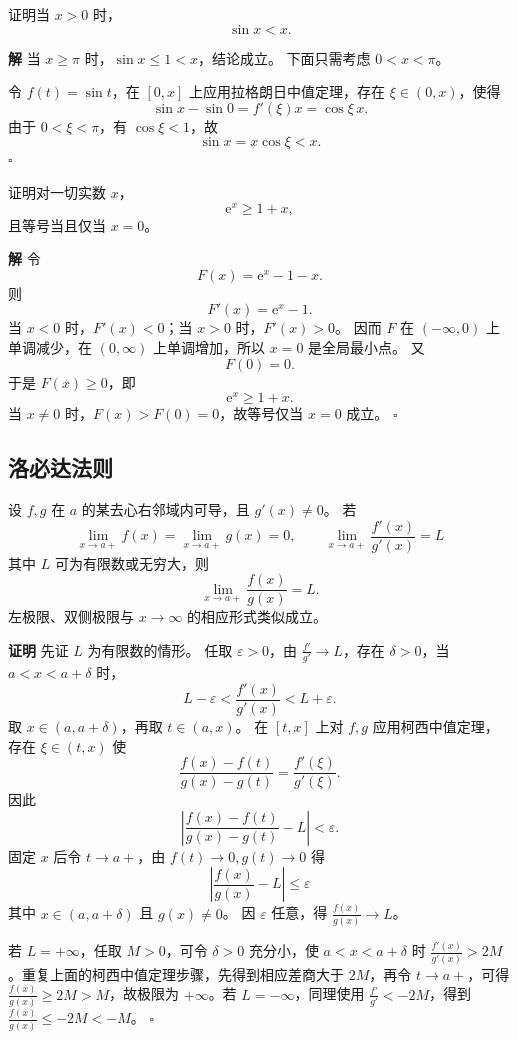 \documentclass[fontset=fandol]{ctexart}
\newenvironment{proofdetail}{\par\noindent\textbf{证明}\quad}{\hfill$\square$\par\vspace{0.8em}}
\newenvironment{solution}{\par\noindent\textbf{解}\quad}{\hfill$\square$\par\vspace{0.8em}}
\newcommand{\ee}{\mathrm{e}}
\begin{document}
\begin{example}[三角函数不等式]
证明当 $x>0$ 时，
\[
\sin x<x.
\]
\end{example}
\begin{solution}
当 $x\geq\pi$ 时，$\sin x\leq1<x$，结论成立。 下面只需考虑 $0<x<\pi$。

令 $f(t)=\sin t$，在 $[0,x]$ 上应用拉格朗日中值定理，存在 $\xi\in(0,x)$，使得
\[
\sin x-\sin0=f'(\xi)x=\cos\xi\,x.
\]
由于 $0<\xi<\pi$，有 $\cos\xi<1$，故
\[
\sin x=x\cos\xi<x.
\]
\end{solution}

\begin{example}[指数函数不等式]
证明对一切实数 $x$，
\[
\ee^x\geq1+x,
\]
且等号当且仅当 $x=0$。
\end{example}
\begin{solution}
令
\[
F(x)=\ee^x-1-x.
\]
则
\[
F'(x)=\ee^x-1.
\]
当 $x<0$ 时，$F'(x)<0$；当 $x>0$ 时，$F'(x)>0$。 因而 $F$ 在 $(-\infty,0)$ 上单调减少，在 $(0,\infty)$ 上单调增加，所以 $x=0$ 是全局最小点。 又
\[
F(0)=0.
\]
于是 $F(x)\geq0$，即
\[
\ee^x\geq1+x.
\]
当 $x\neq0$ 时，$F(x)>F(0)=0$，故等号仅当 $x=0$ 成立。
\end{solution}

\subsection{洛必达法则}

\begin{theorem}[洛必达法则：$0/0$ 型]
设 $f,g$ 在 $a$ 的某去心右邻域内可导，且 $g'(x)\neq0$。 若
\[
\lim_{x\to a+}f(x)=\lim_{x\to a+}g(x)=0,\qquad
\lim_{x\to a+}\frac{f'(x)}{g'(x)}=L
\]
其中 $L$ 可为有限数或无穷大，则
\[
\lim_{x\to a+}\frac{f(x)}{g(x)}=L.
\]
左极限、双侧极限与 $x\to\infty$ 的相应形式类似成立。
\end{theorem}
\begin{proofdetail}
先证 $L$ 为有限数的情形。 任取 $\varepsilon>0$，由 $\frac{f'}{g'}\to L$，存在 $\delta>0$，当 $a<x<a+\delta$ 时，
\[
L-\varepsilon<\frac{f'(x)}{g'(x)}<L+\varepsilon.
\]
取 $x\in(a,a+\delta)$，再取 $t\in(a,x)$。 在 $[t,x]$ 上对 $f,g$ 应用柯西中值定理，存在 $\xi\in(t,x)$ 使
\[
\frac{f(x)-f(t)}{g(x)-g(t)}=\frac{f'(\xi)}{g'(\xi)}.
\]
因此
\[
\left|\frac{f(x)-f(t)}{g(x)-g(t)}-L\right|<\varepsilon.
\]
固定 $x$ 后令 $t\to a+$，由 $f(t)\to0,g(t)\to0$ 得
\[
\left|\frac{f(x)}{g(x)}-L\right|\leq\varepsilon
\]
其中 $x\in(a,a+\delta)$ 且 $g(x)\neq0$。 因 $\varepsilon$ 任意，得 $\frac{f(x)}{g(x)}\to L$。

若 $L=+\infty$，任取 $M>0$，可令 $\delta>0$ 充分小，使 $a<x<a+\delta$ 时 $\frac{f'(x)}{g'(x)}>2M$。重复上面的柯西中值定理步骤，先得到相应差商大于 $2M$，再令 $t\to a+$，可得 $\frac{f(x)}{g(x)}\geq2M>M$，故极限为 $+\infty$。若 $L=-\infty$，同理使用 $\frac{f'}{g'}<-2M$，得到 $\frac{f(x)}{g(x)}\leq-2M<-M$。
\end{proofdetail}
\end{document}
